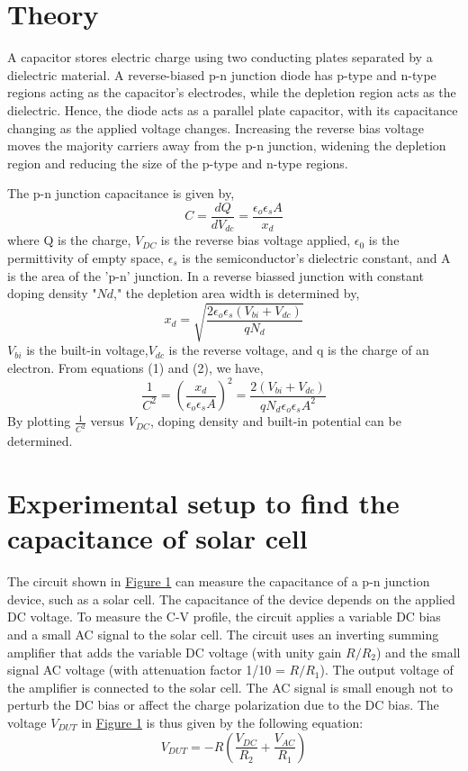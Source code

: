 \section{Theory}
	A capacitor stores electric charge using two conducting plates separated by a dielectric material. A reverse-biased p-n junction diode has p-type and n-type regions acting as the capacitor's electrodes, while the depletion region acts as the dielectric. Hence, the diode acts as a parallel plate capacitor, with its capacitance changing as the applied voltage changes. Increasing the reverse bias voltage moves the majority carriers away from the p-n junction, widening the depletion region and reducing the size of the p-type and n-type regions.

	The p-n junction capacitance is given by,
	\begin{equation}
		C=\frac{dQ}{dV_{dc}}=\frac{\epsilon_o \epsilon_s A}{x_d}
		\label{eq:1}
	\end{equation}
	where Q is the charge, $V_{DC}$ is the reverse bias voltage applied, $\epsilon_0$ is the permittivity of empty space, $\epsilon_s$ is the semiconductor's dielectric constant, and A is the area of the 'p-n' junction. In a reverse biassed junction with constant doping density "$N d$," the depletion area width is determined by,
	\begin{equation}
		x_d=\sqrt{\frac{2 \epsilon_o \epsilon_s (V_{bi}+V_{dc})}{qN_d}}
		\label{eq:2}
	\end{equation}
	$V_{bi}$ is the built-in voltage,$V_{dc}$ is the reverse voltage, and q is the charge of an electron. From equations (1) and (2), we have,
	\begin{equation}
		\frac{1}{C^2}=\left(\frac{x_d}{\epsilon_o \epsilon_s A}\right)^2=\frac{2 (V_{bi}+V_{dc})}{q N_d \epsilon_o \epsilon_s A^2}
		\label{eq:3}
	\end{equation}
	By plotting $\frac{1}{C^2}$ versus $V_{DC}$,
	doping density and built-in potential can be determined.

	\section{Experimental setup to find the capacitance of solar cell}
	The circuit shown in \hyperref[th:1]{Figure 1} can measure the capacitance of a p-n junction device, such as a solar cell. The capacitance of the device depends on the applied DC voltage. To measure the C-V profile, the circuit applies a variable DC bias and a small AC signal to the solar cell. The circuit uses an inverting summing amplifier that adds the variable DC voltage (with unity gain $R/R_2$) and the small signal AC voltage (with attenuation factor 1/10 = $R/R_1$). The output voltage of the amplifier is connected to the solar cell. The AC signal is small enough not to perturb the DC bias or affect the charge polarization due to the DC bias. The voltage $V_{DUT}$ in \hyperref[th:1]{Figure 1} is thus given by the following equation:
	\begin{equation}
		V_{DUT}=-R\left(\frac{V_{DC}}{R_2}+\frac{V_{AC}}{R_1}\right)
		\label{eq:4}
	\end{equation}

